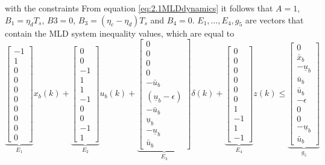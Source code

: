 with the constraints
From equation \ref{eq:2.1MLDdynamics} it follows that $A = 1$, $B_1 = \eta_dT_s$, $B3 = 0$, $B_3 = (\eta_c - \eta_d)T_s$ and $B_4 = 0$. $E_1,\dots,E_4,g_5$ are vectors that contain the MLD system inequality values, which are equal to
$$
\underbrace{\begin{bmatrix} -1 \\ 1 \\ 0 \\ 0 \\ 0 \\ 0 \\ 0 \\ 0 \\ 0 \\ 0 \end{bmatrix}}_{E_1}x_b(k) + 
\underbrace{\begin{bmatrix} 0 \\ 0 \\ -1 \\ 1 \\ 1 \\ -1 \\ 0 \\ 0 \\ -1 \\ 1 \end{bmatrix}}_{E_2}u_b(k) + 
\underbrace{\begin{bmatrix} 0 \\ 0 \\ 0 \\ 0 \\ -\bar{u}_b \\ (\underline{u}_b-\epsilon) \\ -\bar{u}_b \\ \underline{u}_b \\ -\underline{u}_b \\ \bar{u}_b \end{bmatrix}}_{E_3}\delta(k) +
\underbrace{\begin{bmatrix} 0 \\ 0 \\ 0 \\ 0 \\ 0 \\ 0 \\ 1 \\ -1 \\ 1 \\ -1 \end{bmatrix}}_{E_4}z(k) \leq
\underbrace{\begin{bmatrix} 0 \\ \bar{x}_b \\ -\underline{u}_b \\ \bar{u}_b \\ \bar{u}_b \\ -\epsilon \\ 0 \\ 0 \\ -\underline{u}_b \\ \bar{u}_b \end{bmatrix}}_{g_5}
$$